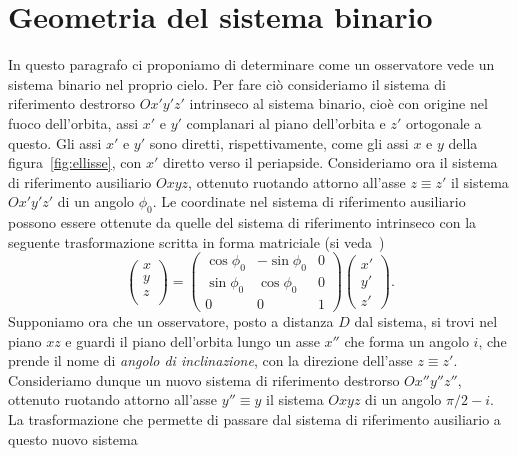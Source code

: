 {\section{Geometria del sistema binario}
\label{sec:geometria-sistema}

In questo paragrafo ci proponiamo di determinare come un osservatore vede un
sistema binario nel proprio cielo. Per fare ciò consideriamo il sistema di
riferimento destrorso $Ox'y'z'$ intrinseco al sistema binario, cioè con origine
nel fuoco dell'orbita, assi $x'$ e $y'$ complanari al piano dell'orbita e $z'$
ortogonale a questo. Gli assi $x'$ e $y'$ sono diretti, rispettivamente, come
gli assi $x$ e $y$ della figura~\ref{fig:ellisse}, con $x'$ diretto verso il
periapside. Consideriamo ora il sistema di riferimento ausiliario $Oxyz$,
ottenuto ruotando attorno all'asse $z\equiv z'$ il sistema $Ox'y'z'$ di un
angolo $\phi_0$. Le coordinate nel sistema di riferimento ausiliario possono
essere ottenute da quelle del sistema di riferimento intrinseco con la seguente
trasformazione scritta in forma matriciale (si
veda~\textcite{goldstein:meccanica})
\begin{equation}
  \begin{pmatrix}
    x \\
    y \\
    z \\
  \end{pmatrix} =
  \begin{pmatrix}
    \cos\phi_0 & -\sin\phi_0 & 0 \\
    \sin\phi_0 & \cos\phi_0  & 0 \\
    0          & 0           & 1
  \end{pmatrix}
  \begin{pmatrix}
    x' \\
    y' \\
    z'
  \end{pmatrix}.
\end{equation}
Supponiamo ora che un osservatore, posto a distanza $D$ dal sistema, si trovi
nel piano $xz$ e guardi il piano dell'orbita lungo un asse $x''$ che forma un
angolo $i$, che prende il nome di \emph{angolo di inclinazione}, con la
direzione dell'asse $z\equiv z'$. Consideriamo dunque un nuovo sistema di
riferimento destrorso $Ox''y''z''$, ottenuto ruotando attorno all'asse
$y''\equiv y$ il sistema $Oxyz$ di un angolo $\pi/2 - i$. La trasformazione che
permette di passare dal sistema di riferimento ausiliario a questo nuovo sistema
}

